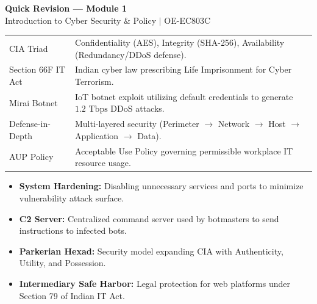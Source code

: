 \documentclass[12pt,a4paper]{article}
\renewcommand{\arraystretch}{1.45}
\begin{document}
\newpage
\begin{center}
  {\large\bfseries\color{myred} Quick Revision --- Module 1}\\[3pt]
  {\small\color{mydark} Introduction to Cyber Security \& Policy $|$ OE-EC803C}
\end{center}
\noindent{\color{myred}\rule{\linewidth}{1.2pt}}
\vspace{4pt}

\begin{tcolorbox}[formulabox, title={\textbf{Key Concepts and Metrics at a Glance}}]
\renewcommand{\arraystretch}{1.35}
\begin{tabularx}{\linewidth}{B{4.8cm} X}
CIA Triad & Confidentiality (AES), Integrity (SHA-256), Availability (Redundancy/DDoS defense). \\[3pt]
Section 66F IT Act & Indian cyber law prescribing Life Imprisonment for Cyber Terrorism. \\[3pt]
Mirai Botnet & IoT botnet exploit utilizing default credentials to generate $1.2\text{ Tbps}$ DDoS attacks. \\[3pt]
Defense-in-Depth & Multi-layered security (Perimeter $\to$ Network $\to$ Host $\to$ Application $\to$ Data). \\[3pt]
AUP Policy & Acceptable Use Policy governing permissible workplace IT resource usage.
\end{tabularx}
\end{tcolorbox}

\begin{tcolorbox}[defbox, title={\textbf{One-Line Definitions}}]
\begin{itemize}[leftmargin=*, itemsep=2pt, topsep=0pt]
  \item \textbf{System Hardening:} Disabling unnecessary services and ports to minimize vulnerability attack surface.
  \item \textbf{C2 Server:} Centralized command server used by botmasters to send instructions to infected bots.
  \item \textbf{Parkerian Hexad:} Security model expanding CIA with Authenticity, Utility, and Possession.
  \item \textbf{Intermediary Safe Harbor:} Legal protection for web platforms under Section 79 of Indian IT Act.
\end{itemize}
\end{tcolorbox}
\end{document}
